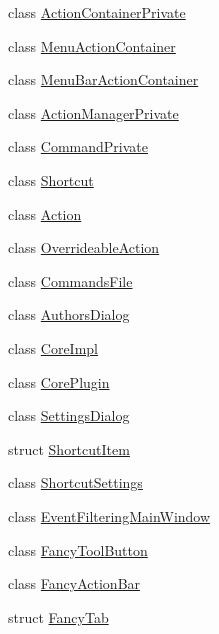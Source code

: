 \begin{DoxyCompactItemize}
\item 
class \hyperlink{class_core_1_1_internal_1_1_action_container_private}{\-Action\-Container\-Private}
\item 
class \hyperlink{class_core_1_1_internal_1_1_menu_action_container}{\-Menu\-Action\-Container}
\item 
class \hyperlink{class_core_1_1_internal_1_1_menu_bar_action_container}{\-Menu\-Bar\-Action\-Container}
\item 
class \hyperlink{class_core_1_1_internal_1_1_action_manager_private}{\-Action\-Manager\-Private}
\item 
class \hyperlink{class_core_1_1_internal_1_1_command_private}{\-Command\-Private}
\item 
class \hyperlink{class_core_1_1_internal_1_1_shortcut}{\-Shortcut}
\item 
class \hyperlink{class_core_1_1_internal_1_1_action}{\-Action}
\item 
class \hyperlink{class_core_1_1_internal_1_1_overrideable_action}{\-Overrideable\-Action}
\item 
class \hyperlink{class_core_1_1_internal_1_1_commands_file}{\-Commands\-File}
\item 
class \hyperlink{class_core_1_1_internal_1_1_authors_dialog}{\-Authors\-Dialog}
\item 
class \hyperlink{class_core_1_1_internal_1_1_core_impl}{\-Core\-Impl}
\item 
class \hyperlink{class_core_1_1_internal_1_1_core_plugin}{\-Core\-Plugin}
\item 
class \hyperlink{class_core_1_1_internal_1_1_settings_dialog}{\-Settings\-Dialog}
\item 
struct \hyperlink{struct_core_1_1_internal_1_1_shortcut_item}{\-Shortcut\-Item}
\item 
class \hyperlink{class_core_1_1_internal_1_1_shortcut_settings}{\-Shortcut\-Settings}
\item 
class \hyperlink{class_core_1_1_internal_1_1_event_filtering_main_window}{\-Event\-Filtering\-Main\-Window}
\item 
class \hyperlink{class_core_1_1_internal_1_1_fancy_tool_button}{\-Fancy\-Tool\-Button}
\item 
class \hyperlink{class_core_1_1_internal_1_1_fancy_action_bar}{\-Fancy\-Action\-Bar}
\item 
struct \hyperlink{struct_core_1_1_internal_1_1_fancy_tab}{\-Fancy\-Tab}
\item 

\end{DoxyCompactItemize}
